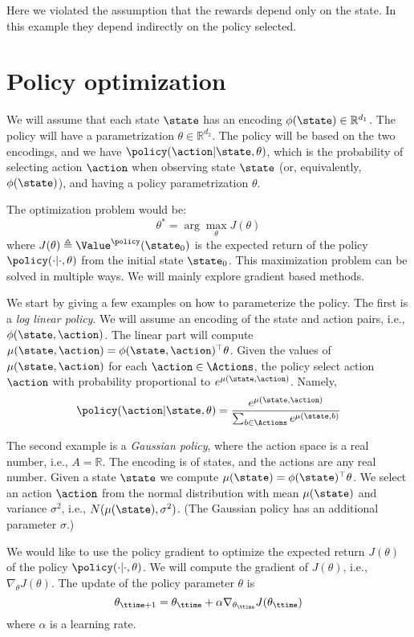 Here we violated the assumption that the rewards depend only on the
state. In this example they depend indirectly on the policy
selected.

\section{Policy optimization}

We will assume that each state $\state$ has an encoding
$\phi(\state)\in \mathbb{R}^{d_1}$. The policy will have a
parametrization $\theta\in \mathbb{R}^{d_2}$. The policy will be
based on the two encodings, and we have
$\policy(\action|\state,\theta)$, which is the probability of
selecting action $\action$ when observing state $\state$ (or,
equivalently, $\phi(\state)$), and having a policy parametrization
$\theta$.

The optimization problem would be:
\[
\theta^* = \arg\max_\theta J(\theta)
\]
where $J(\theta) \triangleq \Value^\policy(\state_0)$ is the
expected return of the policy $\policy(\cdot|\cdot,\theta)$ from the
initial state $\state_0$.
%
This maximization problem can be solved in multiple ways. We will
mainly explore gradient based methods.

We start by giving a few examples on how to parameterize the policy.
The first is a {\em log linear policy}. We will assume an encoding
of the state and action pairs, i.e., $\phi(\state,\action)$. The
linear part will compute
$\mu(\state,\action)=\phi(\state,\action)^\top \theta$. Given the
values of $\mu(\state,\action)$ for each $\action\in \Actions$, the
policy select action $\action$ with probability proportional to
$e^{\mu(\state,\action)}$. Namely,
\[
\policy(\action|\state,\theta)=
\frac{e^{\mu(\state,\action)}}{\sum_{b\in
\Actions}e^{\mu(\state,b)}}
\]

The second example is a {\em Gaussian policy}, where the action
space is a real number, i.e., $A=\mathbb{R}$. The encoding is of
states, and the actions are any real number. Given a state $\state$
we compute $\mu(\state)=\phi(\state)^\top\theta$. We select an
action $\action$ from the normal distribution with mean
$\mu(\state)$ and variance $\sigma^2$, i.e.,
$N(\mu(\state),\sigma^2)$. (The Gaussian policy has an additional
parameter $\sigma$.)

We would like to use the policy gradient to optimize the expected
return  $J(\theta)$ of the policy $\policy(\cdot|\cdot,\theta)$. We
will compute the gradient of $J(\theta)$, i.e., $\nabla_\theta
J(\theta)$. The update of the policy parameter $\theta$ is
\[
\theta_{\ttime+1}=\theta_\ttime + \alpha \nabla_{\theta_\ttime}
J(\theta_\ttime)
\]
where $\alpha$ is a learning rate.

